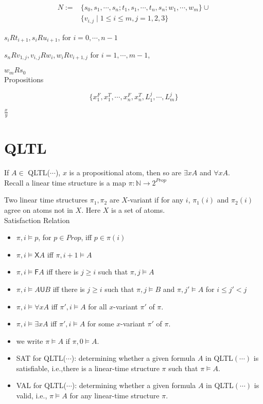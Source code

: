\documentclass[12pt]{article}
\begin{document}
\begin{CJK*}{GBK}{song}
$$\begin{array}{ll}N:=&
\{s_0, s_1,\cdots, s_n; t_1,s_1,\cdots, t_n,s_n; w_1,\cdots, w_m\}\cup\\ & \{v_{i,j}\mid 1\leq i\leq m, j=1,2,3\}\end{array}$$


$s_iR t_{i+1}, s_iRu_{i+1}$, for $i=0,\cdots,n-1$

$s_nR v_{1,j}, v_{i,j}Rw_i, w_iRv_{i+1,j}$ for $i=1,\cdots,m-1$,

$w_mRs_0$ \\


Propositions

$$\{x_1^F, x_1^T, \cdots, x_n^F, x_n^T, L_1^j,\cdots, L_m^j\}$$


$\frac{x}{y}$

\section{QLTL}

If $A\in$ QLTL($\cdots$), $x$ is a propositional atom,  then so are
$\exists x A$ and $\forall xA$.\\


Recall a linear time structure is a map $\pi:\mathbb{N}\rightarrow 2^{Prop}$

Two linear time structures
$\pi_1,\pi_2$ are $X$-variant if for any $i$, $\pi_1(i)$ and $\pi_2(i)$ agree on atoms not in $X$.
Here $X$ is a set of atoms.\\


Satisfaction Relation
\begin{itemize}
\item $\pi, i\models p$, for $p\in Prop$, iff $p\in \pi(i)$
 \item $\pi, i\models \textsf{X}A$ iff $\pi,i+1\models A$
 \item $\pi,i\models \textsf{F}A$ iff there is $j\geq i$ such that $\pi,j\models A$
 \item $\pi,i\models A\textsf{U} B$ iff there is $j\geq i$ such that $\pi,j\models B$ and $\pi,j'\models A$ for $i\leq j'<j$

\item $\pi,i\models \forall x A$ iff $\pi',i\models A$ for all $x$-variant $\pi'$ of $\pi$.
\item $\pi,i\models \exists x A$ iff $\pi',i\models A$ for some $x$-variant $\pi'$ of $\pi$.
\item we write $\pi\models A$ if $\pi,0\models A$.
\item SAT for QLTL($\cdots$): determining whether a given formula $A$ in QLTL$(\cdots)$ is satisfiable, i.e.,there is a linear-time structure $\pi$ such that $\pi\models A$.
\item VAL for QLTL($\cdots$): determining whether a given formula $A$ in QLTL$(\cdots)$ is valid, i.e., $\pi\models A$ for any linear-time structure $\pi$.
\end{itemize}


\end{CJK*}
\end{document}
